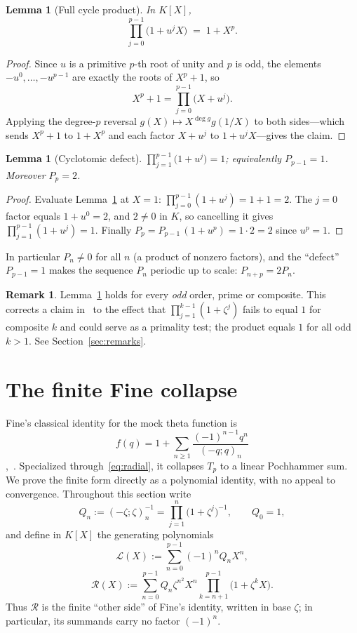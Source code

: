 \documentclass[11pt]{article}
\newtheorem{lemma}[theorem]{Lemma}
\theoremstyle{definition}
\newtheorem{remark}[theorem]{Remark}
\begin{document}
\begin{lemma}[Full cycle product]\label{lem:fullcycle}
In $K[X]$,
\[
  \prod_{j=0}^{p-1}\bigl(1+u^{j}X\bigr)\;=\;1+X^{p}.
\]
\end{lemma}

\begin{proof}
Since $u$ is a primitive $p$-th root of unity and $p$ is odd, the elements $-u^{0},\dots,-u^{p-1}$ are exactly the roots of $X^{p}+1$, so
\[
  X^{p}+1=\prod_{j=0}^{p-1}\bigl(X+u^{j}\bigr).
\]
Applying the degree-$p$ reversal $g(X)\mapsto X^{\deg g}g(1/X)$ to both sides---which sends $X^{p}+1$ to $1+X^{p}$ and each factor $X+u^{j}$ to $1+u^{j}X$---gives the claim.
\end{proof}

\begin{lemma}[Cyclotomic defect]\label{lem:defect}
$\displaystyle\prod_{j=1}^{p-1}\bigl(1+u^{j}\bigr)=1$; equivalently $P_{p-1}=1$. Moreover $P_p=2$.
\end{lemma}

\begin{proof}
Evaluate Lemma~\ref{lem:fullcycle} at $X=1$:
$\prod_{j=0}^{p-1}(1+u^{j})=1+1=2$. The $j=0$ factor equals $1+u^{0}=2$, and $2\ne 0$ in $K$, so cancelling it gives $\prod_{j=1}^{p-1}(1+u^{j})=1$. Finally $P_p=P_{p-1}\,(1+u^{p})=1\cdot 2=2$ since $u^p=1$.
\end{proof}

\noindent In particular $P_n\ne 0$ for all $n$ (a product of nonzero factors), and the ``defect'' $P_{p-1}=1$ makes the sequence $P_n$ periodic up to scale: $P_{n+p}=2P_n$.

\begin{remark}
Lemma~\ref{lem:defect} holds for every \emph{odd} order, prime or composite. This corrects a claim in~\cite{Burke2026} to the effect that $\prod_{j=1}^{k-1}(1+\zeta^{j})$ fails to equal $1$ for composite $k$ and could serve as a primality test; the product equals $1$ for all odd $k>1$. See Section~\ref{sec:remarks}.
\end{remark}

\section{The finite Fine collapse}\label{sec:fine}

Fine's classical identity for the mock theta function is
\[
  f(q)=1+\sum_{n\ge1}\frac{(-1)^{n-1}q^n}{(-q;q)_n}
\]
\cite[Ch.~3]{Fine1988},~\cite{ChenJiLiu2012}. Specialized through~\eqref{eq:radial}, it collapses $T_p$ to a linear Pochhammer sum. We prove the finite form directly as a polynomial identity, with no appeal to convergence. Throughout this section write
\[
  Q_n:=(-\zeta;\zeta)_n^{-1}
      =\prod_{j=1}^{n}\bigl(1+\zeta^j\bigr)^{-1},
  \qquad Q_0=1,
\]
and define in $K[X]$ the generating polynomials
\[
  \mathcal L(X):=\sum_{n=0}^{p-1}(-1)^nQ_nX^n,
\]
\[
  \mathcal R(X):=
  \sum_{n=0}^{p-1}
  Q_n\zeta^{n^2}X^n
  \prod_{k=n+1}^{p-1}\bigl(1+\zeta^kX\bigr).
\]
Thus $\mathcal R$ is the finite ``other side'' of Fine's identity, written in base $\zeta$; in particular, its summands carry no factor $(-1)^n$.
\end{document}
